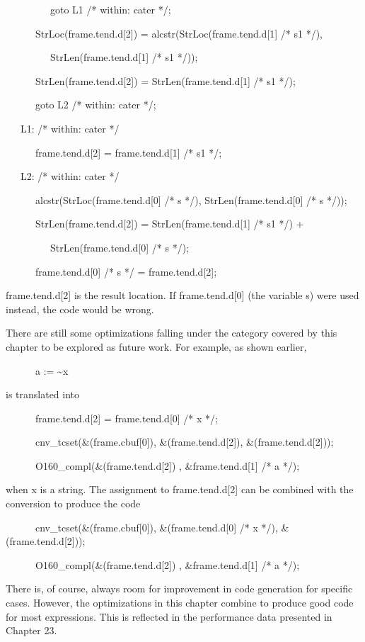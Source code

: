 {\ttfamily\mdseries
\ \ \ \ \ \ \ \ \ goto L1 /* within: cater */;}

{\ttfamily\mdseries
\ \ \ \ \ \ StrLoc(frame.tend.d[2]) = alcstr(StrLoc(frame.tend.d[1] /* s1 */),}

{\ttfamily\mdseries
\ \ \ \ \ \ \ \ \ StrLen(frame.tend.d[1] /* s1 */));}

{\ttfamily\mdseries
\ \ \ \ \ \ StrLen(frame.tend.d[2]) = StrLen(frame.tend.d[1] /* s1 */);}

{\ttfamily\mdseries
\ \ \ \ \ \ goto L2 /* within: cater */;}

{\ttfamily\mdseries
\ \ \ L1: /* within: cater */}

{\ttfamily\mdseries
\ \ \ \ \ \ frame.tend.d[2] = frame.tend.d[1] /* s1 */;}

{\ttfamily\mdseries
\ \ \ L2: /* within: cater */}

{\ttfamily\mdseries
\ \ \ \ \ \ alcstr(StrLoc(frame.tend.d[0] /* s */), StrLen(frame.tend.d[0] /* s */));}

{\ttfamily\mdseries
\ \ \ \ \ \ StrLen(frame.tend.d[2]) = StrLen(frame.tend.d[1] /* s1 */) +}

{\ttfamily\mdseries
\ \ \ \ \ \ \ \ \ StrLen(frame.tend.d[0] /* s */);}


\bigskip

{\ttfamily\mdseries
\ \ \ \ \ \ frame.tend.d[0] /* s */ = frame.tend.d[2];}


frame.tend.d[2] is the result location. If frame.tend.d[0] (the
variable s) were used instead, the code would be wrong.


There are still some optimizations falling under the category covered
by this chapter to be explored as future work. For example, as shown
earlier,

{\ttfamily\mdseries
\ \ \ \ \ \ a := \~{}x}

\noindent is translated into

{\ttfamily\mdseries
\ \ \ \ \ \ frame.tend.d[2] = frame.tend.d[0] /* x */;}

{\ttfamily\mdseries
\ \ \ \ \ \ cnv\_tcset(\&(frame.cbuf[0]), \&(frame.tend.d[2]), \&(frame.tend.d[2]));}

{\ttfamily\mdseries
\ \ \ \ \ \ O160\_compl(\&(frame.tend.d[2]) , \&frame.tend.d[1] /* a */);}

\noindent when x is a string. The assignment to frame.tend.d[2] can be
combined with the conversion to produce the code

{\ttfamily\mdseries
\ \ \ \ \ \ cnv\_tcset(\&(frame.cbuf[0]), \&(frame.tend.d[0] /* x */), \&(frame.tend.d[2]));}

{\ttfamily\mdseries
\ \ \ \ \ \ O160\_compl(\&(frame.tend.d[2]) , \&frame.tend.d[1] /* a */);}

There is, of course, always room for improvement in code generation
for specific cases. However, the optimizations in this chapter combine
to produce good code for most expressions. This is reflected in the
performance data presented in Chapter 23.

